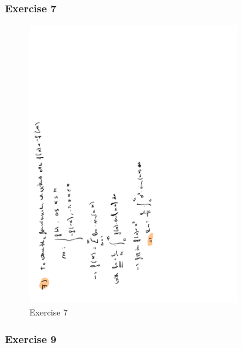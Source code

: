 \documentclass[a4paper]{report}
\begin{document}
\subsubsection{Exercise 7}

\begin{figure}[H]
	\centering
	\includegraphics[width=0.8\textwidth]{assets/huis_9_ex_7.pdf}
	\caption{Exercise 7}
	\label{fig:huis_9_ex_7}
\end{figure}

\subsubsection{Exercise 9}
\end{document}
